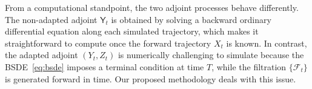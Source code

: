 \documentclass[letterpaper, 10 pt, conference]{ieeeconf}  %
\def\Re{\mathbb{R}}
\newcommand{\field}[1]{\mathbb{#1}}
\def\Re{\field{R}}
\def\Expect{{\mathbb E}}
\newcommand{\ud}{\,\mathrm{d}}
\def\Re{\mathbb{R}}
\renewcommand{\Re}{\mathbb{R}}
\newcommand{\Yn}{\mathsf Y}
\begin{document}
    From a computational standpoint, the two adjoint processes behave differently.  
The non-adapted adjoint $\Yn_t$ is obtained by solving a backward ordinary differential equation along each simulated trajectory, which makes it straightforward to compute once the forward trajectory $X_t$ is known.  
In contrast, the adapted adjoint $(Y_t,Z_t)$ is numerically challenging to simulate because the BSDE~\eqref{eq:bsde} imposes a terminal condition at time $T$, while the filtration $\{\mathcal F_t\}$ is generated forward in time. 
Our proposed methodology deals with this issue.


\end{document}
